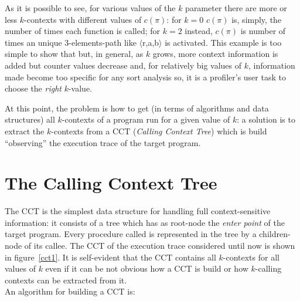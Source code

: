 \documentclass[a4paper,11pt]{report}
\begin{document}
As it is possible to see, for various values of the $k$ parameter there are more or less $k$-contexts with different values of $c(\pi)$: for $k=0$ $c(\pi)$ is, simply, the number of times each function is called; for $k=2$ instead, $c(\pi)$ is number of times an unique 3-elements-path like $\langle$r,a,b$\rangle$ is activated. This example is too simple to show that but, in general, as $k$ grows, more context information is added but counter values decrease and, for relatively big values of $k$, information made become too specific for any sort analysis so, it is a profiler's user task to choose the \emph{right} $k$-value.

At this point, the problem is how to get (in terms of algorithms and data
structures) all $k$-contexts of a program run for a given value of $k$: a solution is to extract the $k$-contexts from a CCT (\emph{Calling Context Tree}) which is build
``observing'' the execution trace of the target program.

\section{The Calling Context Tree}

The CCT is the simplest data structure for handling full context-sensitive information: 
it consists of a tree which has as root-node the \emph{enter point} of the target program.
Every procedure called is represented in the tree by a children-node of its callee. 
The CCT of the execution trace considered until now is shown in figure~\ref{cct1}.
It is self-evident that the CCT contains all $k$-contexts for all values of $k$ even if 
it can be not obvious how a CCT is build or how $k$-calling contexts can be extracted from it.\\
An algorithm for building a CCT is:
\end{document}
